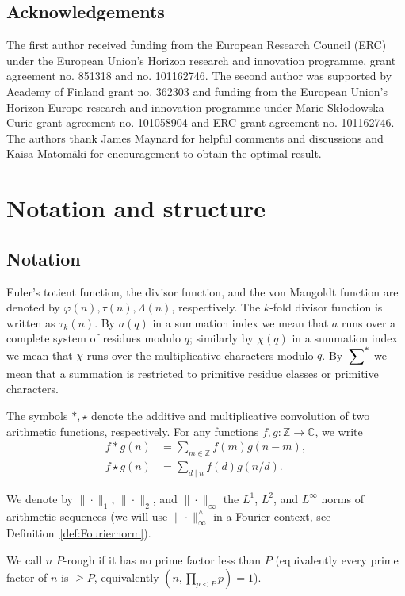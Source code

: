 \documentclass[12pt]{amsart}
\theoremstyle{definition}
\theoremstyle{remark}
\numberwithin{equation}{section}
\newcommand{\asum}{\sideset{}{^{\ast}}\sum}
\newcommand{\1}{\mathbf{1}}
\begin{document}
\subsection{Acknowledgements}
The first author received funding from the European Research Council (ERC) under the European Union's Horizon research and innovation programme, grant 
agreement no. 851318 and no. 101162746. The second author was supported by Academy of Finland grant no. 362303 and funding from the European Union's Horizon Europe research and innovation programme under Marie Sk\l{}odowska-Curie grant agreement no. 101058904 and ERC grant agreement no. 101162746. The authors thank James Maynard for helpful comments and discussions and Kaisa Matom\"aki for encouragement to obtain the optimal result.	

\section{Notation and structure}

\subsection{Notation}

Euler's totient function, the divisor function, and the von Mangoldt function are denoted by $\varphi(n),\tau(n), \Lambda(n)$, respectively. The $k$-fold divisor function is written as $\tau_k(n)$. By $a(q)$ in a summation index we mean that $a$ runs over a complete system of residues modulo $q$; similarly by $\chi(q)$ in a summation index we mean that $\chi$ runs over the multiplicative characters modulo $q$. By $\asum$ we mean that a summation is restricted to primitive residue classes or primitive characters. 

The symbols $*,\star$ denote the additive and multiplicative convolution of two arithmetic functions, respectively. For any functions $f,g\colon \mathbb{Z}\to \mathbb{C}$, we write
\begin{align*}
    f*g(n)&=\sum_{m\in \mathbb{Z}}f(m)g(n-m), \\
    f\star g(n)&=\sum_{d\mid n}f(d)g(n/d).
\end{align*}

We denote by $\|\cdot\|_1$, $\|\cdot\|_2$, and $\|\cdot\|_\infty$ the $L^1$, $L^2$, and $L^\infty$ norms of arithmetic sequences (we will use $ \|\cdot\|_{\infty}^{\wedge}$ in a Fourier context, see Definition~\ref{def:Fouriernorm}).

We call $n$ $P$-rough if it has no prime factor less than $P$ (equivalently every prime factor of $n$ is $\geq P$, equivalently $(n,\prod_{p<P}p)=1$).
\end{document}
